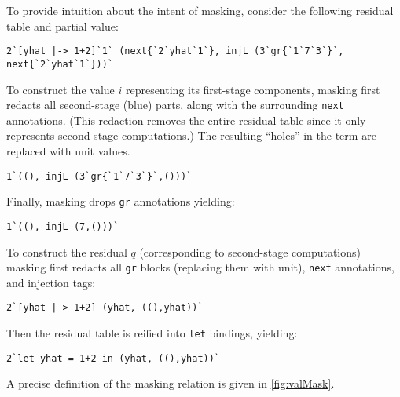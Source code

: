 \begin{abstrsyn}
To provide intuition about the intent of masking, consider the
following residual table and partial value:
\begin{lstlisting}
2`[yhat |-> 1+2]`1` (next{`2`yhat`1`}, injL (3`gr{`1`7`3`}`, next{`2`yhat`1`}))`
\end{lstlisting}
To construct the value $i$ representing its first-stage components,
masking first redacts all second-stage (blue) parts, along with the
surrounding \texttt{next} annotations. (This redaction removes the
entire residual table since it only represents second-stage
computations.) The resulting ``holes'' in the term are replaced with
unit values.
\begin{lstlisting}
1`((), injL (3`gr{`1`7`3`}`,()))`
\end{lstlisting}
Finally, masking drops \texttt{gr} annotations yielding:
\begin{lstlisting}
1`((), injL (7,()))`
\end{lstlisting}
To construct the residual $q$ (corresponding to second-stage computations) masking first redacts all \texttt{gr} blocks
(replacing them with unit), \texttt{next} annotations, and injection tags:
\begin{lstlisting}
2`[yhat |-> 1+2] (yhat, ((),yhat))`
\end{lstlisting}
Then the residual table is reified into \texttt{let} bindings,
yielding:
\begin{lstlisting}
2`let yhat = 1+2 in (yhat, ((),yhat))`
\end{lstlisting}
A precise definition of the masking relation is given in
\ref{fig:valMask}.



\end{abstrsyn}
